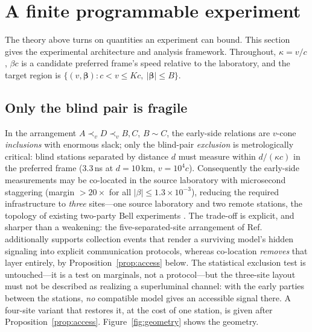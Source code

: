 \documentclass[10pt,twocolumn]{article}
\begin{document}
\section{A finite programmable experiment}
\label{sec:experiment}

The theory above turns on quantities an experiment can bound. This section gives the experimental architecture and analysis framework. Throughout, $\kappa=v/c$, $\beta c$ is a candidate preferred frame's speed relative to the laboratory, and the target region is $\{(v,\boldsymbol\beta): c<v\le Kc,\ |\boldsymbol\beta|\le B\}$.

\subsection{Only the blind pair is fragile}

In the arrangement $A \prec_v D \prec_v B,C$, $B\sim C$, the early-side relations are $v$-cone \emph{inclusions} with enormous slack; only the blind-pair \emph{exclusion} is metrologically critical: blind stations separated by distance $d$ must measure within $d/(\kappa c)$ in the preferred frame ($3.3$\,ns at $d=10$\,km, $v=10^4c$). Consequently the early-side measurements may be co-located in the source laboratory with microsecond staggering (margin $>20\times$ for all $|\beta|\le1.3\times10^{-3}$), reducing the required infrastructure to \emph{three} sites---one source laboratory and two remote stations, the topology of existing two-party Bell experiments \cite{Salart2008}. The trade-off is explicit, and sharper than a weakening: the five-separated-site arrangement of Ref.~\cite{Li2026} additionally supports collection events that render a surviving model's hidden signaling into explicit communication protocols, whereas co-location \emph{removes} that layer entirely, by Proposition~\ref{prop:access} below. The statistical exclusion test is untouched---it is a test on marginals, not a protocol---but the three-site layout must not be described as realizing a superluminal channel: with the early parties between the stations, \emph{no} compatible model gives an accessible signal there. A four-site variant that restores it, at the cost of one station, is given after Proposition~\ref{prop:access}. Figure~\ref{fig:geometry} shows the geometry.
\end{document}

